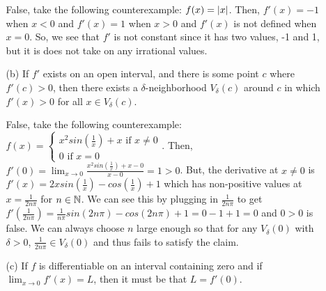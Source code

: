 \documentclass[12pt,letterpaper]{article}
\begin{document}
\begin{itemize}[leftmargin=!,labelindent=5pt]
\begin{itemize}
                    False, take the following counterexample: $f(x) = \abs{x}$. Then, $f'(x) = -1$ when $x < 0$ and $f'(x) = 1$ when $x > 0$ and $f'(x)$ is not defined when $x=0$.
                    So, we see that $f'$ is not constant since it has two values, -1 and 1, but it is does not take on any irrational values.
                \item [(b)] If $f'$ exists on an open interval, and there is some point $c$ where $f'(c) > 0$, then there exists a $\delta$-neighborhood $V_\delta(c)$ around $c$ in which $f'(x) > 0$ for all $x \in V_\delta(c)$.
                
                    False, take the following counterexample:
                    $f(x) = 
                    \begin{cases}
                        x^2 sin(\frac{1}{x}) + x \text{ if } x \neq 0\\
                        0 \text{ if } x = 0
                    \end{cases}$.
                    Then, $f'(0) = \lim_{x\to 0} \frac{x^2 sin(\frac{1}{x}) + x - 0}{x - 0} = 1 > 0$.
                    But, the derivative at $x \neq 0$ is $f'(x) = 2x sin(\frac{1}{x}) - cos(\frac{1}{x}) + 1$ which has non-positive values at $x = \frac{1}{2n\pi}$ for $n\in \mathbb{N}$.
                    We can see this by plugging in $\frac{1}{2n\pi}$ to get $f'(\frac{1}{2n\pi}) = \frac{1}{n\pi} sin(2n\pi) - cos(2n\pi) + 1 = 0 - 1 + 1 = 0$ and $0 > 0$ is false.
                    We can always choose $n$ large enough so that for any $V_\delta(0)$ with $\delta > 0$, $\frac{1}{2n\pi} \in V_\delta(0)$ and thus fails to satisfy the claim.
                \newpage
                \item [(c)] If $f$ is differentiable on an interval containing zero and if $\lim_{x\to 0} f'(x) = L$, then it must be that $L = f'(0)$.
                

\end{itemize}
\end{itemize}
\end{document}
